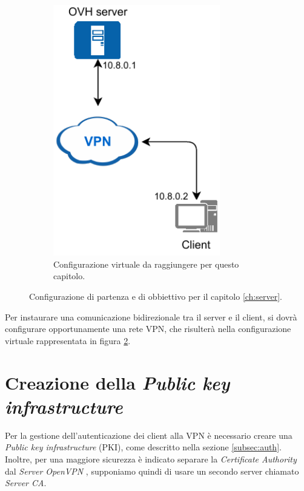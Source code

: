 \begin{figure}[H]
\begin{subfigure}{0.49\textwidth}
        \includegraphics[width=0.8\textwidth]{immagini/diag-simple_ips_vpn}
        \caption{Configurazione virtuale da raggiungere per questo capitolo.}
        \label{fig:diag-simple_ips_vpn}
    \end{subfigure}%
    \caption{Configurazione di partenza e di obbiettivo per il capitolo \ref{ch:server}.}
\end{figure}

Per instaurare una comunicazione bidirezionale tra il server e il client, si dovrà configurare opportunamente una rete VPN, che risulterà nella configurazione virtuale rappresentata in figura \ref{fig:diag-simple_ips_vpn}.

\section{Creazione della \textit{Public key infrastructure} \ok}
\label{sec:pki_ca}

Per la gestione dell'autenticazione dei client alla VPN è necessario creare una \textit{Public key infrastructure} (PKI), come descritto nella sezione \ref{subsec:auth}. Inoltre, per una maggiore sicurezza è indicato separare la \textit{Certificate Authority} dal \textit{Server OpenVPN} \cite{openvpn-as-ca}, supponiamo quindi di usare un secondo server chiamato \textit{Server CA}. 

